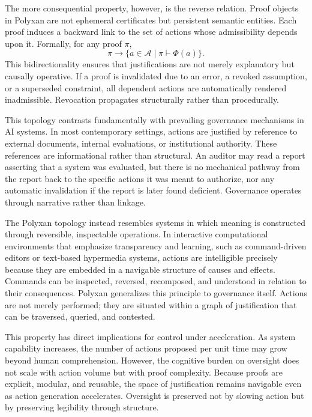 \documentclass[11pt,oneside]{article}
\begin{document}
The more consequential property, however, is the reverse relation. Proof objects in Polyxan are not ephemeral certificates but persistent semantic entities. Each proof induces a backward link to the set of actions whose admissibility depends upon it. Formally, for any proof \( \pi \),
\[
\pi \rightarrow \{ a \in \mathcal{A} \mid \pi \vdash \Phi(a) \}.
\]
This bidirectionality ensures that justifications are not merely explanatory but causally operative. If a proof is invalidated due to an error, a revoked assumption, or a superseded constraint, all dependent actions are automatically rendered inadmissible. Revocation propagates structurally rather than procedurally.

This topology contrasts fundamentally with prevailing governance mechanisms in AI systems. In most contemporary settings, actions are justified by reference to external documents, internal evaluations, or institutional authority. These references are informational rather than structural. An auditor may read a report asserting that a system was evaluated, but there is no mechanical pathway from the report back to the specific actions it was meant to authorize, nor any automatic invalidation if the report is later found deficient. Governance operates through narrative rather than linkage.

The Polyxan topology instead resembles systems in which meaning is constructed through reversible, inspectable operations. In interactive computational environments that emphasize transparency and learning, such as command-driven editors or text-based hypermedia systems, actions are intelligible precisely because they are embedded in a navigable structure of causes and effects. Commands can be inspected, reversed, recomposed, and understood in relation to their consequences. Polyxan generalizes this principle to governance itself. Actions are not merely performed; they are situated within a graph of justification that can be traversed, queried, and contested.

This property has direct implications for control under acceleration. As system capability increases, the number of actions proposed per unit time may grow beyond human comprehension. However, the cognitive burden on oversight does not scale with action volume but with proof complexity. Because proofs are explicit, modular, and reusable, the space of justification remains navigable even as action generation accelerates. Oversight is preserved not by slowing action but by preserving legibility through structure.
\end{document}
